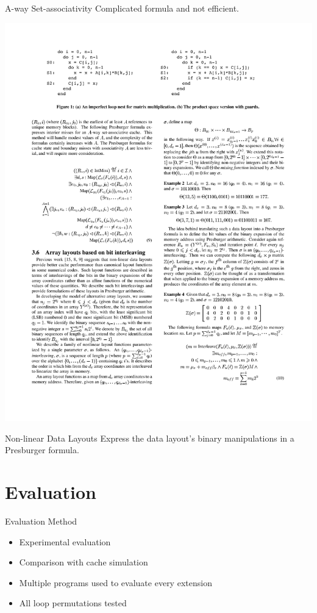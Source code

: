 \documentclass{beamer}
\begin{document}
\begin{frame}{A-way Set-associativity}
  Complicated formula and not efficient.


  \begin{center}
    \includegraphics[scale=1.1]{eq9}
  \end{center}
\end{frame}

\begin{frame}{Non-linear Data Layouts}
  Express the data layout's binary manipulations in a Presburger formula.
\end{frame}


\section{Evaluation}

\begin{frame}{Evaluation Method}
  \begin{itemize}
    \item Experimental evaluation
    \item Comparison with cache simulation
    \item Multiple programs used to evaluate every extension
    \item All loop permutations tested
  \end{itemize}
\end{frame}
\end{document}
